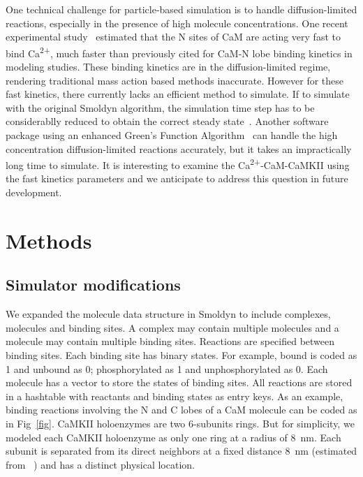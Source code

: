 \documentclass[10pt,letterpaper]{article}
\begin{document}

One technical challenge for particle-based simulation is to handle diffusion-limited reactions, especially in the presence of high molecule concentrations. One recent experimental study~\cite{Faas:2011fna} estimated that the N sites of CaM are acting very fast to bind Ca\textsuperscript{2+}, much faster than previously cited for CaM-N lobe binding kinetics in modeling studies. These binding kinetics are in the diffusion-limited regime, rendering traditional mass action based methods inaccurate. However for these fast kinetics, there currently lacks an efficient method to simulate. If to simulate with the original Smoldyn algorithm, the simulation time step has to be considerablly reduced to obtain the correct steady state~\cite{Andrews:2015}. Another software package using an enhanced Green's Function Algorithm~\cite{vanZon:2005jd} can handle the high concentration diffusion-limited reactions accurately, but it takes an impractically long time to simulate. It is interesting to examine the Ca\textsuperscript{2+}-CaM-CaMKII using the fast kinetics parameters and we anticipate to address this question in future development.

\section*{Methods}
\subsection*{Simulator modifications}

We expanded the molecule data structure in Smoldyn to include complexes, molecules and binding sites. A complex may contain multiple molecules and a molecule may contain multiple binding sites. Reactions are specified between binding sites. Each binding site has binary states. For example, bound is coded as 1 and unbound as 0; phosphorylated as 1 and unphosphorylated as 0. Each molecule has a vector to store the states of binding sites. All reactions are stored in a hashtable with reactants and binding states as entry keys. As an example, binding reactions involving the N and C lobes of a CaM molecule can be coded as in Fig~\ref{fig}. CaMKII holoenzymes are two 6-subunits rings. But for simplicity, we modeled each CaMKII holoenzyme as only one ring at a radius of \SI{8}{\nm}. Each subunit is separated from its direct neighbors at a fixed distance \SI{8}{\nm} (estimated from ~\cite{Gaertner:2004jk}) and has a distinct physical location.
\end{document}
